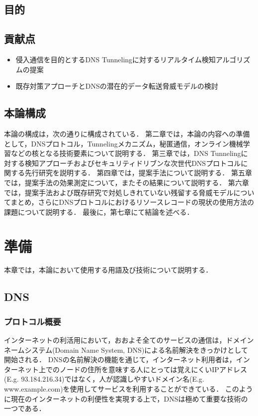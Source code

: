 \documentclass[12pt]{jarticle} %
\begin{document}
\subsection{目的}
\subsection{貢献点}
\begin{itemize}
 \item 侵入通信を目的とするDNS Tunnelingに対するリアルタイム検知アルゴリズムの提案
 \item 既存対策アプローチとDNSの潜在的データ転送脅威モデルの検討
\end{itemize}
\subsection{本論構成}
本論の構成は，次の通りに構成されている．
第二章では，本論の内容への準備として，DNSプロトコル，Tunnelingメカニズム，秘匿通信，オンライン機械学習などの核となる技術要素について説明する．
第三章では，DNS Tunnelingに対する検知アプローチおよびセキュリティドリブンな次世代DNSプロトコルに関する先行研究を説明する．
第四章では，提案手法について説明する．
第五章では，提案手法の効果測定について，またその結果について説明する．
第六章では，提案手法および既存研究で対処しきれていない残留する脅威モデルについてまとめ，さらにDNSプロトコルにおけるリソースレコードの現状の使用方法の課題について説明する．
最後に，第七章にて結論を述べる．

\newpage
\section{準備}
本章では，本論において使用する用語及び技術について説明する．
\subsection{DNS}
\subsubsection{プロトコル概要}
インターネットの利活用において，おおよそ全てのサービスの通信は，ドメインネームシステム(Domain Name System, DNS)による名前解決をきっかけとして開始される．
DNSの名前解決の機能を通じて，インターネット利用者は，インターネット上でのノードの住所を意味する人にとっては覚えにくいIPアドレス(E.g. 93.184.216.34)ではなく，人が認識しやすいドメイン名(E.g. www.example.com)を使用してサービスを利用することができている．
このように現在のインターネットの利便性を実現する上で，DNSは極めて重要な技術の一つである．
\end{document}
